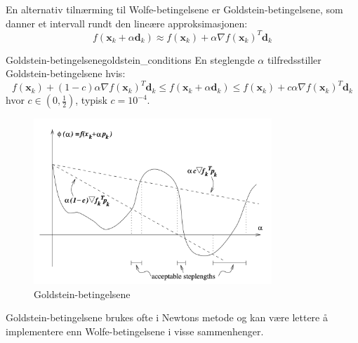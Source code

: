 En alternativ tilnærming til Wolfe-betingelsene er Goldstein-betingelsene, som danner et intervall rundt den lineære approksimasjonen:
\[
	f(\symbf{x}_k + \alpha\symbf{d}_k) \approx f(\symbf{x}_k) + \alpha\nabla f(\symbf{x}_k)^T\symbf{d}_k
\]

\begin{definition}{Goldstein-betingelsene}{goldstein_conditions}
	En steglengde \(\alpha\) tilfredsstiller Goldstein-betingelsene hvis:
	\begin{equation}\label{eq:goldstein_conditions}
		f(\symbf{x}_k) + (1-c)\alpha\nabla f(\symbf{x}_k)^T\symbf{d}_k  \leq f(\symbf{x}_k + \alpha\symbf{d}_k) \leq f(\symbf{x}_k) + c\alpha\nabla f(\symbf{x}_k)^T\symbf{d}_k
	\end{equation}
	hvor \(c \in (0, \frac{1}{2})\), typisk \(c = 10^{-4}\).
\end{definition}
\begin{figure}[H]
	\centering
	\includegraphics[width=0.8\textwidth]{figures/goldstein_conditions.png}
	\caption{Goldstein-betingelsene}
	\label{fig:goldstein_conditions}
\end{figure}

Goldstein-betingelsene brukes ofte i Newtons metode og kan være lettere å implementere enn Wolfe-betingelsene i visse sammenhenger.

